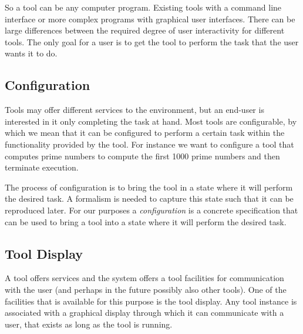 \documentclass{article}
\begin{document}
   So a tool can be any computer program. Existing tools with a command line
   interface or more complex programs with graphical user interfaces.
   There can be large differences between the required degree of user
   interactivity for different tools. The only goal for a user is to get the
   tool to perform the task that the user wants it to do.

  \subsection{Configuration}

   Tools may offer different services to the environment, but an end-user is
   interested in it only completing the task at hand. Most tools are
   configurable, by which we mean that it can be configured to perform a
   certain task within the functionality provided by the tool. For instance we
   want to configure a tool that computes prime numbers to compute the first
   1000 prime numbers and then terminate execution.

   The process of configuration is to bring the tool in a state where it will
   perform the desired task. A formalism is needed to capture this state such
   that it can be reproduced later. For our purposes a \textit{configuration}
   is a concrete specification that can be used to bring a tool into a state
   where it will perform the desired task.

  \subsection{Tool Display}

   A tool offers services and the system offers a tool facilities for
   communication with the user (and perhaps in the future possibly also other
   tools). One of the facilities that is available for this purpose is the tool
   display. Any tool instance is associated with a graphical display through
   which it can communicate with a user, that exists as long as the tool is
   running.
   
\end{document}
